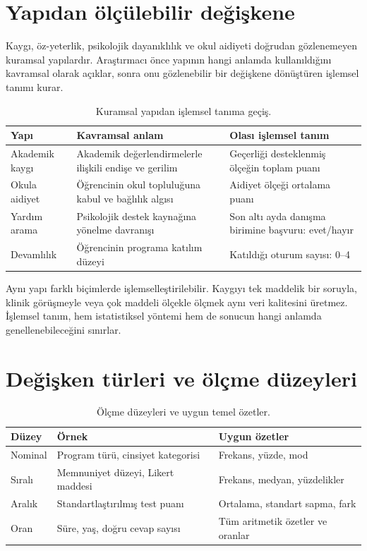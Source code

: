 \section{Yapıdan ölçülebilir değişkene}

Kaygı, öz-yeterlik, psikolojik dayanıklılık ve okul aidiyeti doğrudan
gözlenemeyen kuramsal yapılardır. Araştırmacı önce yapının hangi anlamda
kullanıldığını kavramsal olarak açıklar, sonra onu gözlenebilir bir değişkene
dönüştüren işlemsel tanımı kurar.

\begin{table}[htbp]
\centering
\caption{Kuramsal yapıdan işlemsel tanıma geçiş.}
\begin{tabular}{@{}p{}p{}p{}@{}}
\toprule
Yapı & Kavramsal anlam & Olası işlemsel tanım \\
\midrule
Akademik kaygı & Akademik değerlendirmelerle ilişkili endişe ve gerilim & Geçerliği desteklenmiş ölçeğin toplam puanı \\
Okula aidiyet & Öğrencinin okul topluluğuna kabul ve bağlılık algısı & Aidiyet ölçeği ortalama puanı \\
Yardım arama & Psikolojik destek kaynağına yönelme davranışı & Son altı ayda danışma birimine başvuru: evet/hayır \\
Devamlılık & Öğrencinin programa katılım düzeyi & Katıldığı oturum sayısı: 0--4 \\
\bottomrule
\end{tabular}
\end{table}

Aynı yapı farklı biçimlerde işlemselleştirilebilir. Kaygıyı tek maddelik bir
soruyla, klinik görüşmeyle veya çok maddeli ölçekle ölçmek aynı veri kalitesini
üretmez. İşlemsel tanım, hem istatistiksel yöntemi hem de sonucun hangi anlamda
genellenebileceğini sınırlar.

\section{Değişken türleri ve ölçme düzeyleri}
\label{sec:population-data-types}

\begin{table}[htbp]
\centering
\caption{Ölçme düzeyleri ve uygun temel özetler.}
\begin{tabular}{p{}p{}p{}}
\toprule
Düzey & Örnek & Uygun özetler \\
\midrule
Nominal & Program türü, cinsiyet kategorisi & Frekans, yüzde, mod \\
Sıralı & Memnuniyet düzeyi, Likert maddesi & Frekans, medyan, yüzdelikler \\
Aralık & Standartlaştırılmış test puanı & Ortalama, standart sapma, fark \\
Oran & Süre, yaş, doğru cevap sayısı & Tüm aritmetik özetler ve oranlar \\
\bottomrule
\end{tabular}
\end{table}

